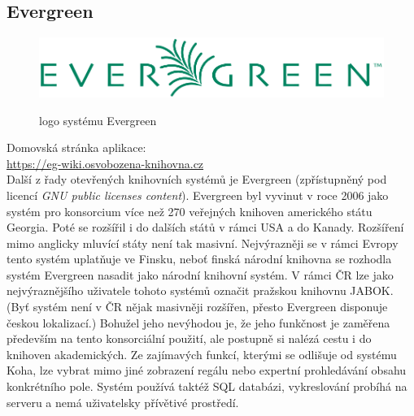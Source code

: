 \subsection{Evergreen}
\begin{figure}
	\centering
	\includegraphics[width=\linewidth]{img/Evergreen_Logo.png}\\
	\caption[logo systému Evergreen ze stránky \url{https://eg-wiki.osvobozena-knihovna.cz/}]{logo systému Evergreen}
\end{figure}
Domovská stránka aplikace: \\\url{https://eg-wiki.osvobozena-knihovna.cz}\\
Další z řady otevřených knihovních systémů je Evergreen (zpřístupněný pod
licencí \textit{GNU public licenses content}).
Evergreen byl vyvinut v roce 2006 jako systém pro konsorcium více
než 270 veřejných knihoven amerického státu Georgia.
Poté se rozšířil i do dalších států v rámci USA a do Kanady.
Rozšíření mimo anglicky mluvící státy není tak masivní.
Nejvýrazněji se v rámci Evropy tento systém uplatňuje ve Finsku,
neboť finská národní knihovna se rozhodla systém Evergreen nasadit
jako národní knihovní systém. V rámci ČR lze jako nejvýraznějšího
uživatele tohoto systémů označit pražskou knihovnu JABOK. (Byť systém není
v ČR nějak masivněji rozšířen, přesto Evergreen disponuje českou lokalizací.)
Bohužel jeho nevýhodou je, že jeho funkčnost je zaměřena především na tento
konsorciální použití, ale postupně si nalézá cestu i do knihoven akademických.
Ze zajímavých funkcí, kterými se odlišuje od systému Koha, lze vybrat mimo
jiné zobrazení regálu nebo expertní prohledávání obsahu konkrétního pole.
Systém používá taktéž SQL databázi, vykreslování probíhá na serveru
a nemá uživatelsky přívětivé prostředí.



